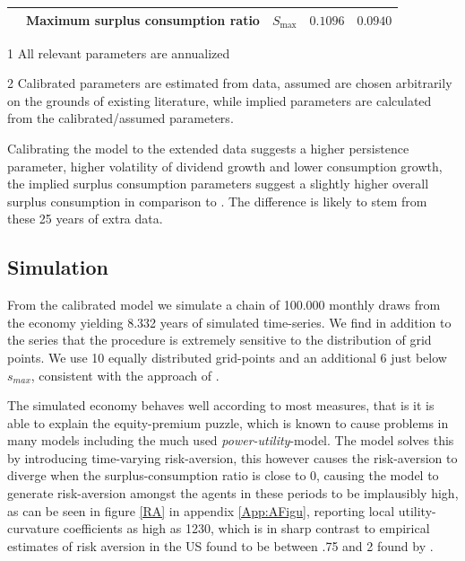 \begin{table}[H]
\begin{adjustbox}{max width=\textwidth}
\begin{threeparttable}[b]
\begin{tabular}{@{}lllcc@{}}
 & Maximum surplus consumption ratio      & $S_{\text{max}}$ & $0.1096$  & $0.0940$\\ \bottomrule
\end{tabular}
\begin{tablenotes}
\footnotesize{\item [1] All relevant parameters are annualized
              \item [2] Calibrated parameters are estimated from data, assumed are chosen arbitrarily on the grounds of existing literature, while implied parameters are calculated from the calibrated/assumed parameters.}
\end{tablenotes}
\end{threeparttable}
\end{adjustbox}
\end{table}

Calibrating the model to the extended data suggests a higher persistence parameter, higher volatility of dividend growth and lower consumption growth, the implied surplus consumption parameters suggest a slightly higher overall surplus consumption in comparison to \cite{Campbell1999}. The difference is likely to stem from these 25 years of extra data. 

\subsection{Simulation}
From the calibrated model we simulate a chain of 100.000 monthly draws from the economy yielding 8.332 years of simulated time-series. We find in addition to the series that the procedure is extremely sensitive to the distribution of grid points. We use 10 equally distributed grid-points and an additional 6 just below $s_{max}$, consistent with the approach of \citet{Campbell1999}.


The simulated economy behaves well according to most measures, that is it is able to explain the equity-premium puzzle, which is known to cause problems in many models including the much used \textit{power-utility}-model. The \citet{Campbell1999} model solves this by introducing time-varying risk-aversion, this however causes the risk-aversion to diverge when the surplus-consumption ratio is close to 0, causing the model to generate risk-aversion amongst the agents in these periods to be implausibly high, as can be seen in figure \ref{RA} in appendix \ref{App:AFigu}, reporting local utility-curvature coefficients as high as 1230, which is in sharp contrast to empirical estimates of risk aversion in the US found to be between .75 and 2 found by \citet{SLFred2015}.

